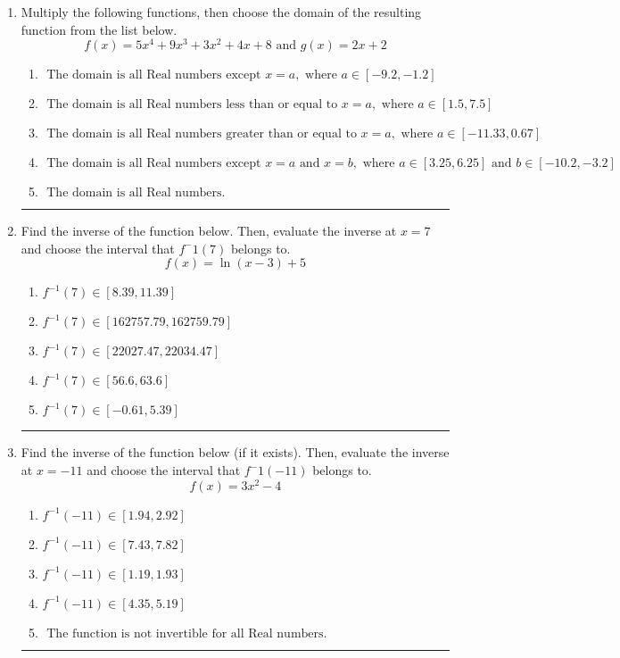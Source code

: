 \documentclass[14pt]{extbook}
\newcommand{\litem}[1]{\item#1\hspace*{-1cm}\rule{\textwidth}{0.4pt}}
\begin{document}
\begin{enumerate}
{\begin{enumerate}[label=\Alph*.]
\end{enumerate} }
\litem{
Multiply the following functions, then choose the domain of the resulting function from the list below.\[ f(x) = 5x^{4} +9 x^{3} +3 x^{2} +4 x + 8 \text{ and } g(x) = 2x + 2 \]\begin{enumerate}[label=\Alph*.]
\item \( \text{ The domain is all Real numbers except } x = a, \text{ where } a \in [-9.2, -1.2] \)
\item \( \text{ The domain is all Real numbers less than or equal to } x = a, \text{ where } a \in [1.5, 7.5] \)
\item \( \text{ The domain is all Real numbers greater than or equal to } x = a, \text{ where } a \in [-11.33, 0.67] \)
\item \( \text{ The domain is all Real numbers except } x = a \text{ and } x = b, \text{ where } a \in [3.25, 6.25] \text{ and } b \in [-10.2, -3.2] \)
\item \( \text{ The domain is all Real numbers. } \)

\end{enumerate} }
\litem{
Find the inverse of the function below. Then, evaluate the inverse at $x = 7$ and choose the interval that $f^-1(7)$ belongs to.\[ f(x) = \ln{(x-3)}+5 \]\begin{enumerate}[label=\Alph*.]
\item \( f^{-1}(7) \in [8.39, 11.39] \)
\item \( f^{-1}(7) \in [162757.79, 162759.79] \)
\item \( f^{-1}(7) \in [22027.47, 22034.47] \)
\item \( f^{-1}(7) \in [56.6, 63.6] \)
\item \( f^{-1}(7) \in [-0.61, 5.39] \)

\end{enumerate} }
\litem{
Find the inverse of the function below (if it exists). Then, evaluate the inverse at $x = -11$ and choose the interval that $f^-1(-11)$ belongs to.\[ f(x) = 3 x^2 - 4 \]\begin{enumerate}[label=\Alph*.]
\item \( f^{-1}(-11) \in [1.94, 2.92] \)
\item \( f^{-1}(-11) \in [7.43, 7.82] \)
\item \( f^{-1}(-11) \in [1.19, 1.93] \)
\item \( f^{-1}(-11) \in [4.35, 5.19] \)
\item \( \text{ The function is not invertible for all Real numbers. } \)


\end{enumerate}}
\end{enumerate}
\end{document}
